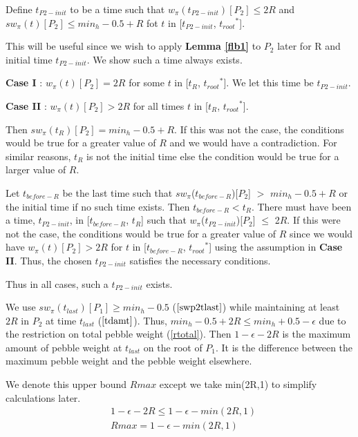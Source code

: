 \documentclass[oribib1]{llncs}
\newcommand{\troots}{{t_{root}}^*}
\begin{document}
\begin{definition}\label{ddr2}

Define $t_{P2-init}$ to be a time such that $w_{\pi}(t_{P2-init})[P_2] \leq 2R$ and $sw_{\pi}(t)[P_2] \leq min_h-0.5+R$ fot $t$ in [$t_{P2-init}$, $\troots$]. 
\end{definition}

This will be useful since we wish to apply {\bf Lemma \ref{flb1}} to $P_2$ later for R and initial time $t_{P2-init}$. We show such a time always exists.

\noindent
{\bf Case I} : $w_{\pi}(t)[P_2] = 2R$ for some $t$ in [$t_{R}$, $\troots$]. We let this time be $t_{P2-init}$.


\noindent
{\bf Case II} :  $w_{\pi}(t)[P_2] > 2R$ for all times $t$ in [$t_R$, $\troots$].

Then $sw_{\pi}(t_{R})[P_2] = min_h-0.5+R$. If this was not the case, the conditions would be true for a greater value of ${R}$ and we would have a contradiction. For similar reasons, $t_{R}$ is not the initial time else the condition would be true for a larger value of $R$.

Let $t_{before-R}$ be the last time such that $sw_{\pi}$($t_{before-R}$)[$P_2$] $>$ $min_h-0.5+R$ or the initial time if no such time exists. Then $t_{before-R} < t_{R}$. There must have been a time, $t_{P2-init}$,  in [$t_{before-R}$, $t_{R}$] such that $w_{\pi}$($t_{P2-init}$)[$P_2$] $\leq$ 2$R$. If this were not the case, the conditions would be true for a greater value of ${R}$ since we would have $w_{\pi}(t)[P_2] > 2{R}$ for $t$ in [$t_{before-R}$, $\troots$] using the assumption in {\bf Case II}. Thus, the chosen $t_{P2-init}$ satisfies the necessary conditions.



Thus in all cases, such a $t_{P2-init}$ exists.


\medskip

We use $sw_{\pi}(t_{last})[P_1] \geq min_h-0.5$ ($\ref{swp2tlast}$) while maintaining at least $2R$ in $P_2$ at time $t_{last}$ ($\ref{tdamt}$). Thus, $min_h-0.5 + 2R \leq min_h+ 0.5 -\epsilon$ due to the restriction on total pebble weight (\ref{rtotal}). Then
$1 -\epsilon- 2R$ is the maximum amount of pebble weight at $t_{last}$ on the root of $P_1$. It is the difference between the maximum pebble weight and the pebble weight elsewhere.

We denote this upper bound $Rmax$ except we take min(2R,1) to simplify calculations later.
\begin{eqnarray}  & 1 -\epsilon- 2R \leq 1 -\epsilon- min(2R,1)
\label{RMAXexp} \\
 & Rmax = 1 -\epsilon- min(2R,1) \label{RMAX}
\end{eqnarray}
\end{document}
